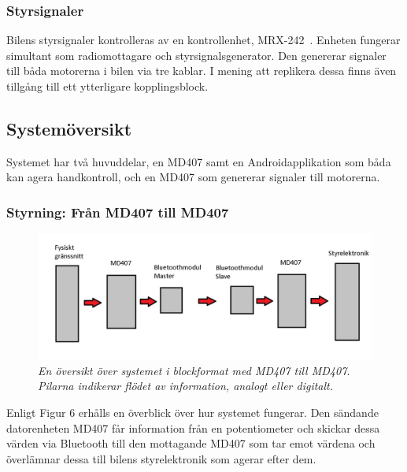 \documentclass[a4paper]{article}
\begin{document}
\subsubsection{Styrsignaler}
Bilens styrsignaler kontrolleras av en kontrollenhet, MRX-242~\cite{projektDir}. Enheten fungerar simultant som radiomottagare och styrsignalsgenerator. Den genererar signaler till båda motorerna i bilen via tre kablar. I mening att replikera dessa finns även tillgång till ett ytterligare kopplingsblock.


\subsection{Systemöversikt}
Systemet har två huvuddelar, en MD407 samt en Androidapplikation som båda kan agera handkontroll, och en MD407 som genererar signaler till motorerna.

\subsubsection{Styrning: Från MD407 till MD407}
\begin{figure}[H]
\includegraphics[width=\textwidth]{systemoversikt.jpg}
\centering
\caption{\it En översikt över systemet i blockformat med MD407 till MD407. Pilarna indikerar flödet av information, analogt eller digitalt.}
\end{figure} 


Enligt Figur 6 erhålls en överblick över hur systemet fungerar. Den sändande datorenheten MD407 får information från en potentiometer och skickar dessa värden via Bluetooth till den mottagande MD407 som tar emot värdena och överlämnar dessa till bilens styrelektronik som agerar efter dem.
\end{document}
